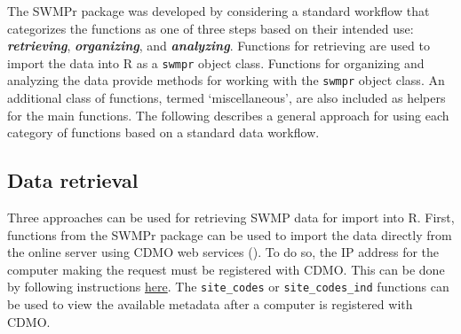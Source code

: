 \documentclass[10pt,letterpaper]{article}\usepackage[]{graphicx}\usepackage[]{color}
\begin{document}
The SWMPr package was developed by considering a standard workflow that categorizes the functions as one of three steps based on their intended use: {\bf{\it retrieving}}, {\bf{\it organizing}}, and {\bf{\it analyzing}}.  Functions for retrieving are used to import the data into R as a \texttt{swmpr} object class.  Functions for organizing and analyzing the data provide methods for working with the \texttt{swmpr} object class.  An additional class of functions, termed `miscellaneous', are also included as helpers for the main functions.  The following describes a general approach for using each category of functions based on a standard data workflow.  

\subsection*{Data retrieval}

Three approaches can be used for retrieving \ac{SWMP} data for import into R.  First, functions from the SWMPr package can be used to import the data directly from the online server using \ac{CDMO} web services ().  To do so, the IP address for the computer making the request must be registered with \ac{CDMO}.  This can be done by following instructions \href{http://cdmo.baruch.sc.edu/webservices.cfm}{here}.  The \texttt{site\_codes} or \texttt{site\_codes\_ind} functions can be used to view the available metadata after a computer is registered with \ac{CDMO}. 
\end{document}
